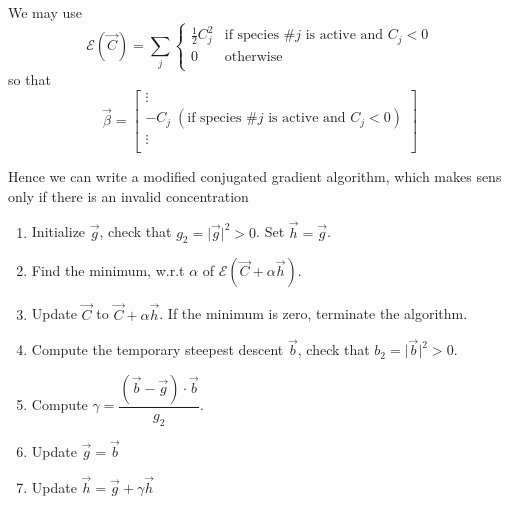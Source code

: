 \documentclass[aps]{revtex4}
\begin{document}
We may use
\begin{equation}
\mathcal{E}\left(\vec{C}\right) = \sum_{j} 
\left\lbrace
\begin{array}{ll}
\frac{1}{2} C_j^2 & \text{if species $\#j$ is  active  and $C_j<0$}  \\
0 & \text{otherwise}\\
\end{array}
\right. 
\end{equation}
so that
\begin{equation}
	\vec{\beta} =
	\begin{bmatrix}
	\vdots\\
	-C_j \; (\text{if species $\#j$ is  active  and $C_j<0$})\\
	\vdots\\
	\end{bmatrix}
\end{equation}

Hence we can write a modified conjugated gradient algorithm, which makes sens only if there is
an invalid concentration

\begin{enumerate}
\item Initialize $\vec{g}$, check that $g_2=\vert\vec{g}\vert^2>0$. Set $\vec{h}=\vec{g}$.
\item Find the minimum, w.r.t $\alpha$ of $\mathcal{E}\left(\vec{C}+\alpha \vec{h}\right)$. 
\item Update $\vec{C}$ to $\vec{C}+\alpha\vec{h}$. If the minimum is zero, terminate the algorithm.
\item Compute the temporary steepest descent $\vec{b}$, check that $b_2=\vert\vec{b}\vert^2>0$.
\item Compute $\gamma=\dfrac{\left(\vec{b}-\vec{g}\right)\cdot \vec{b}}{g_2}$.
\item Update $\vec{g} = \vec{b}$
\item Update $\vec{h} = \vec{g} + \gamma \vec{h}$
\end{enumerate}
\end{document}
